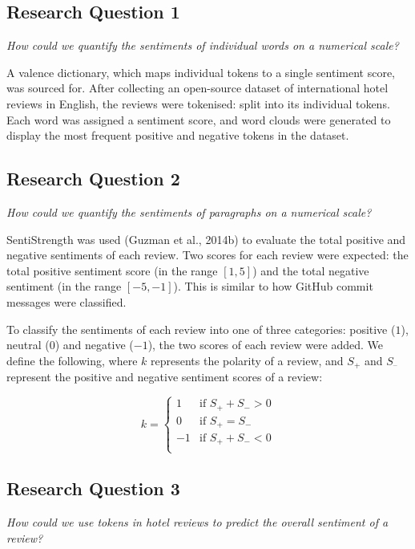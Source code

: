 \documentclass[12pt,bibliography=totocnumbered]{scrartcl}
\begin{document}
{\subsection{Research Question 1}
\it{How could we quantify the sentiments of individual words on a numerical scale?}

A valence dictionary, which maps individual tokens to a single
sentiment score, was sourced for. After collecting an open-source dataset
of international hotel reviews in English, the reviews were tokenised:
split into its individual tokens. Each word was assigned a sentiment score,
and word clouds were generated to display the most frequent positive and
negative tokens in the dataset.

\subsection{Research Question 2}
\it{How could we quantify the sentiments of paragraphs on a numerical scale?}

SentiStrength was used (Guzman et al., 2014b) to evaluate the total positive %
and negative sentiments of each review. Two scores for each review were expected:
the total positive sentiment score (in the range $[1, 5]$) and the total negative
sentiment (in the range $[-5, -1]$). This is similar to how GitHub commit
messages were classified.

To classify the sentiments of each review into one of three categories:
positive ($1$), neutral ($0$) and negative ($-1$), the two scores of each review
were added. We define the following, where $k$ represents the polarity of a review,
and $S_+$ and $S_–$ represent the positive and negative sentiment scores of a review:

\begin{equation}
	k = \begin{cases}
		1 & \text{if } S_+ + S_- > 0 \\
		0 & \text{if } S_+ = S_- \\ 
		-1 & \text{if } S_+ + S_- < 0 \\
	\end{cases}
	\label{eq:polarity}
\end{equation}

\subsection{Research Question 3}
\it{How could we use tokens in hotel reviews to predict the overall sentiment of a review?}

}
\end{document}
